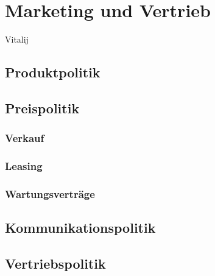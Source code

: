 
\section{Marketing und Vertrieb}
Vitalij
\subsection{Produktpolitik}
\subsection{Preispolitik}
\subsubsection{Verkauf}
\subsubsection{Leasing}
\subsubsection{Wartungsverträge}
\subsection{Kommunikationspolitik}
\subsection{Vertriebspolitik}